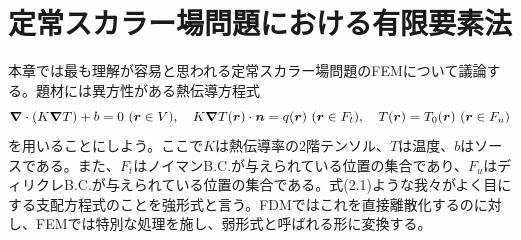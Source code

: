 \documentclass[dvipdfmx, 9pt, a4paper]{jsarticle}
\numberwithin{equation}{section}
\newcommand{\bm}[1]{{\mbox{\boldmath $#1$}}}
\newcommand{\bnabla}{\bm \nabla}
\begin{document}
\section{定常スカラー場問題における有限要素法}
本章では最も理解が容易と思われる定常スカラー場問題のFEMについて議論する。題材には異方性がある熱伝導方程式
\begin{equation}
\bnabla \cdot (K\bnabla T)+b=0~(\bm r \in V),~~~K\bnabla T(\bm r)\cdot \bm n =q(\bm r)~(\bm r \in F_t),~~~T(\bm r)=T_0(\bm r)~(\bm r \in F_u)
\end{equation}
を用いることにしよう。ここで$K$は熱伝導率の2階テンソル、$T$は温度、$b$はソースである。また、$F_t$はノイマンB.C.が与えられている位置の集合であり、$F_u$はディリクレB.C.が与えられている位置の集合である。式(2.1)ような我々がよく目にする支配方程式のことを強形式と言う。FDMではこれを直接離散化するのに対し、FEMでは特別な処理を施し、弱形式と呼ばれる形に変換する。
\end{document}
